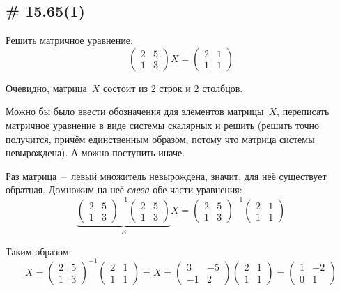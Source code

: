 \documentclass[a4paper,12pt]{article}
\theoremstyle{remark}
\begin{document}
  
  
  \subsection{\# 15.65(1)}

  Решить матричное уравнение:
  \[
    \begin{pmatrix}
      2 & 5\\
      1 & 3
    \end{pmatrix} X = \begin{pmatrix}
      2 & 1\\
      1 & 1
    \end{pmatrix}
  \]
  
  \begin{solution}
    Очевидно, матрица~$X$ состоит из $2$ строк и $2$ столбцов.
    
    Можно бы было ввести обозначения для элементов матрицы~$X$, переписать матричное уравнение в виде системы скалярных и решить (решить точно получится, причём единственным образом, потому что матрица системы невырождена).
    А можно поступить иначе.
    
    Раз матрица~--~левый множитель невырождена, значит, для неё существует обратная.
    Домножим на неё \emph{слева} обе части уравнения:
    \[
      \underbrace{\begin{pmatrix}
        2 & 5\\
        1 & 3
      \end{pmatrix}^{-1}
      \begin{pmatrix}
        2 & 5\\
        1 & 3
      \end{pmatrix}}_{E} X = \begin{pmatrix}
        2 & 5\\
        1 & 3
      \end{pmatrix}^{-1} \begin{pmatrix}
        2 & 1\\
        1 & 1
      \end{pmatrix}
    \]
    
    Таким образом:
    \[
      X = \begin{pmatrix}
        2 & 5\\
        1 & 3
      \end{pmatrix}^{-1} \begin{pmatrix}
        2 & 1\\
        1 & 1
      \end{pmatrix}
      = X = \begin{pmatrix}
        3 & -5\\
        -1 & 2
      \end{pmatrix} \begin{pmatrix}
        2 & 1\\
        1 & 1
      \end{pmatrix}
      = \begin{pmatrix}
        1 & -2\\
        0 & 1
      \end{pmatrix}
    \]
    

\end{solution}
\end{document}
